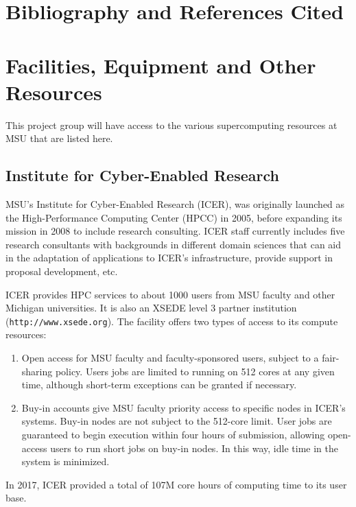 \documentclass[10pt]{article}
\begin{document}
%
\clearpage

\clearpage
%
\clearpage

\clearpage

\clearpage

\clearpage

\clearpage

\section{Bibliography and References Cited}











\section{Facilities, Equipment and Other Resources}

This project group will have access to the various supercomputing resources at MSU that are listed here.
\subsection{Institute for Cyber-Enabled Research}

MSU's Institute for Cyber-Enabled Research (ICER), was originally launched as
the High-Performance Computing Center (HPCC) in 2005, before expanding
its mission in 2008 to include research consulting. ICER staff currently
includes five research consultants with backgrounds in different domain
sciences that can aid in the adaptation of applications to ICER's
infrastructure, provide support in proposal development, etc.

ICER provides HPC services to about 1000 users from MSU faculty and other
Michigan universities. It is also an XSEDE level 3 partner institution
(\texttt{http://www.xsede.org}). The facility offers two types of access
to its compute resources:
\begin{enumerate}
\item Open access for MSU faculty and faculty-sponsored users, subject to
a fair-sharing policy. Users jobs are limited to running on 512 cores at
any given time, although short-term exceptions can be granted if necessary.
\item Buy-in accounts give MSU faculty priority access to specific nodes
in ICER's systems. Buy-in nodes are not subject to the 512-core limit.
User jobs are guaranteed to begin execution within four hours of submission,
allowing open-access users to run short jobs on buy-in nodes. In this way,
idle time in the system is minimized.
\end{enumerate}
In 2017, ICER provided a total of 107M core hours of computing time to its
user base.
\end{document}
